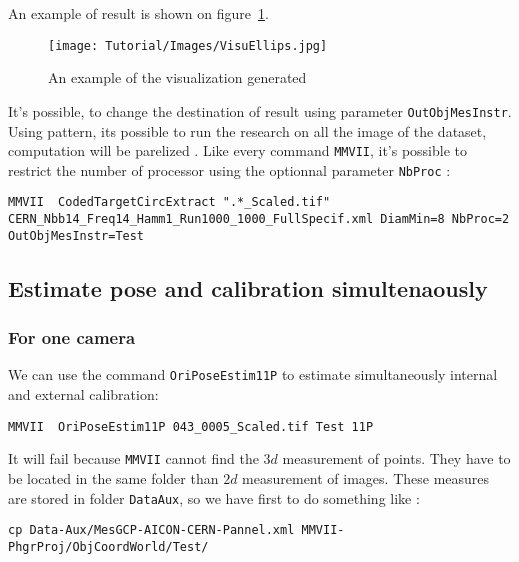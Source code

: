 An example of result is shown on figure~\ref{fig:CodeT:Panel}.

\begin{figure}
\centering
	\texttt{[image: Tutorial/Images/VisuEllips.jpg]}
	\caption{An example of the visualization generated}
\label{fig:CodeT:Panel}
\end{figure}

It's possible, to change the destination of result using parameter {\tt OutObjMesInstr}.
Using pattern, its possible to run the research on all the image of the dataset, computation will be parelized .
Like every command {\tt MMVII}, it's possible to restrict the number of processor using the optionnal parameter
{\tt NbProc} :

\begin{lstlisting}
MMVII  CodedTargetCircExtract ".*_Scaled.tif" CERN_Nbb14_Freq14_Hamm1_Run1000_1000_FullSpecif.xml DiamMin=8 NbProc=2 OutObjMesInstr=Test
\end{lstlisting}



\subsection{Estimate pose and calibration simultenaously}


\subsubsection{For one camera}

We can use the command {\tt OriPoseEstim11P} to estimate simultaneously internal and external
calibration:

\begin{lstlisting}
MMVII  OriPoseEstim11P 043_0005_Scaled.tif Test 11P
\end{lstlisting}

It will fail because {\tt MMVII} cannot find the $3d$ measurement of points. They 
have to be located in the same folder than $2d$ measurement of images.
These measures are stored in folder {\tt DataAux}, so we have first to do
something like :

\begin{lstlisting}
cp Data-Aux/MesGCP-AICON-CERN-Pannel.xml MMVII-PhgrProj/ObjCoordWorld/Test/
\end{lstlisting}

